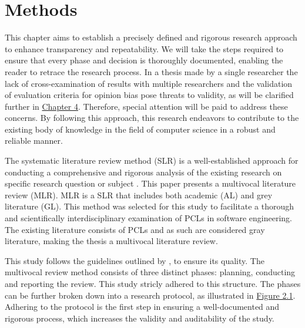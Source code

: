\chapter{Methods\label{methods}}
This chapter aims to establish a precisely defined and rigorous research approach to enhance transparency and repeatability. We will take the steps required to ensure that every phase and decision is thoroughly documented, enabling the reader to retrace the research process. In a thesis made by a single researcher the lack of cross-examination of results with multiple researchers and the validation of evaluation criteria for opinion bias pose threats to validity, as will be clarified further in \hyperref[discussion]{Chapter 4}. Therefore, special attention will be paid to address these concerns. By following this approach, this research endeavors to contribute to the existing body of knowledge in the field of computer science in a robust and reliable manner.

The systematic literature review method (SLR) is a well-established approach for conducting a comprehensive and rigorous analysis of the existing research on specific research question or subject \citep{kitchenham2007}. This paper presents a multivocal literature review (MLR). MLR is a SLR that includes both academic (AL) and grey literature (GL). This method was selected for this study to facilitate a thorough and scientifically interdisciplinary examination of PCLs in software engineering. The existing literature consists of PCLs and as such are considered gray literature, making the thesis a multivocal literature review.

This study follows the guidelines outlined by \cite{kitchenham2007}, to ensure its quality. The multivocal review method consists of three distinct phases: planning, conducting and reporting the review. This study stricly adhered to this structure. The phases can be further broken down into a research protocol, as illustrated in \hyperref[fig:slrphases]{Figure 2.1}. Adhering to the protocol is the first step in ensuring a well-documented and rigorous process, which increases the validity and auditability of the study.

